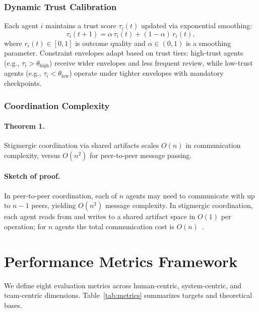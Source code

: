 \documentclass[11pt]{article}
\begin{document}
\subsubsection{Dynamic Trust Calibration}

Each agent $i$ maintains a trust score $\tau_i(t)$ updated via exponential smoothing:
\begin{equation}
\tau_i(t+1) = \alpha \,\tau_i(t) + (1-\alpha)\, r_i(t),
\end{equation}
where $r_i(t) \in [0,1]$ is outcome quality and $\alpha \in (0,1)$ is a smoothing parameter. Constraint envelopes adapt based on trust tiers: high-trust agents (e.g., $\tau_i > \theta_{\text{high}}$) receive wider envelopes and less frequent review, while low-trust agents (e.g., $\tau_i < \theta_{\text{low}}$) operate under tighter envelopes with mandatory checkpoints.

\subsubsection{Coordination Complexity}

\paragraph{Theorem 1.} Stigmergic coordination via shared artifacts scales $O(n)$ in communication complexity, versus $O(n^2)$ for peer-to-peer message passing.

\paragraph{Sketch of proof.} In peer-to-peer coordination, each of $n$ agents may need to communicate with up to $n-1$ peers, yielding $O(n^2)$ message complexity. In stigmergic coordination, each agent reads from and writes to a shared artifact space in $O(1)$ per operation; for $n$ agents the total communication cost is $O(n)$~\cite{heylighen2016stigmergy}.

\section{Performance Metrics Framework}

We define eight evaluation metrics across human-centric, system-centric, and team-centric dimensions. Table~\ref{tab:metrics} summarizes targets and theoretical bases.
\end{document}
